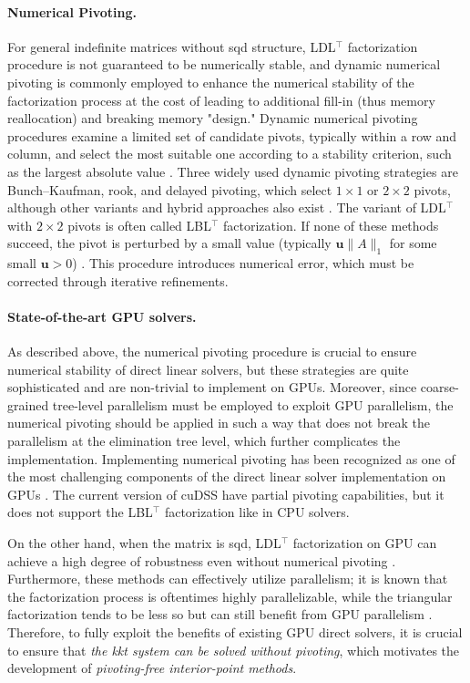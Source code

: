\documentclass{article}
\begin{document}
\paragraph{Numerical Pivoting.}

For general indefinite matrices without \gls*{sqd} structure, LDL$^\top$ factorization procedure is not guaranteed to be numerically stable, and dynamic numerical pivoting is commonly employed to enhance the numerical stability of the factorization process at the cost of leading to additional fill-in (thus memory reallocation) and breaking memory "design." Dynamic numerical pivoting procedures examine a limited set of candidate pivots, typically within a row and column, and select the most suitable one according to a stability criterion, such as the largest absolute value \cite{schenkFASTFACTORIZATIONPIVOTING}. Three widely used dynamic pivoting strategies are Bunch–Kaufman, rook, and delayed pivoting, which select $1 \times 1$ or $2 \times 2$ pivots, although other variants and hybrid approaches also exist \cite{}. The variant of LDL$^\top$ with $2 \times 2$ pivots is often called LBL$^\top$ factorization. If none of these methods succeed, the pivot is perturbed by a small value (typically $\mathbf{u}\|A\|_1$ for some small $\mathbf{u} > 0$) \cite{schenkFASTFACTORIZATIONPIVOTING}. This procedure introduces numerical error, which must be corrected through iterative refinements.

\paragraph{State-of-the-art GPU solvers.}
As described above, the numerical pivoting procedure is crucial to ensure numerical stability of direct linear solvers, but these strategies are quite sophisticated and are non-trivial to implement on GPUs. Moreover, since coarse-grained tree-level parallelism must be employed to exploit GPU parallelism, the numerical pivoting should be applied in such a way that does not break the parallelism at the elimination tree level, which further complicates the implementation. Implementing numerical pivoting has been recognized as one of the most challenging components of the direct linear solver implementation on GPUs \cite{swirydowiczLinearSolversPower2022}. The current version of cuDSS have partial pivoting capabilities, but it does not support the LBL$^\top$ factorization like in CPU solvers.

On the other hand, when the matrix is \gls*{sqd}, LDL$^\top$ factorization on GPU can achieve a high degree of robustness even without numerical pivoting \cite{vanderbeiSymmetricQuasidefiniteMatrices1995}. Furthermore, these methods can effectively utilize parallelism; it is known that the factorization process is oftentimes highly parallelizable, while the triangular factorization tends to be less so but can still benefit from GPU parallelism \cite{naumovParallelSolutionSparse}. Therefore, to fully exploit the benefits of existing GPU direct solvers, it is crucial to ensure that \emph{the \gls*{kkt} system can be solved without pivoting}, which motivates the development of \emph{pivoting-free interior-point methods}.
\end{document}

